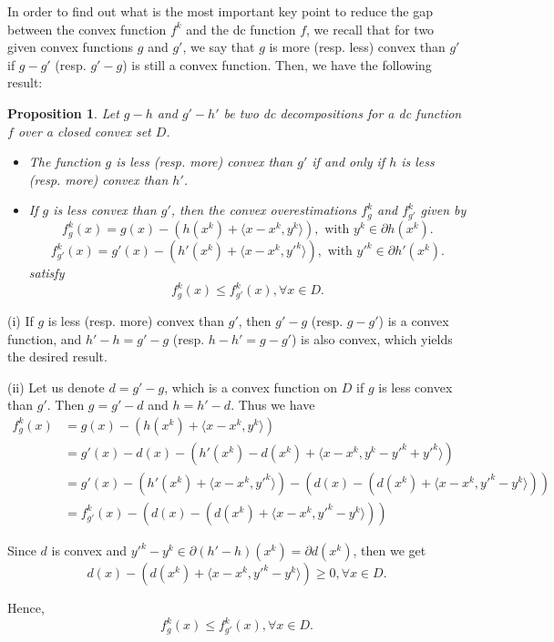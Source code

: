 \documentclass[3p]{elsarticle}
\newtheorem{prop}[thm]{Proposition}
\begin{document}
In order to find out what is the most important key point to reduce the gap between the convex function $f^k$ and the dc function $f$, we recall that for two given convex functions $g$ and $g'$, we say that $g$ is more (resp. less) convex than $g'$ if $g-g'$ (resp. $g'-g$) is still a convex function. Then, we have the following result:
\begin{prop}\label{prop:betterdcd}
	Let $g-h$ and $g'-h'$ be two dc decompositions for a dc function $f$ over a closed convex set $D$. 
	\begin{itemize}
		\item[(i)] The function $g$ is less (resp. more) convex than $g'$ if and only if $h$ is less (resp. more) convex than $h'$.
		\item[(ii)] If $g$ is less convex than $g'$, then the convex overestimations $f_g^k$ and $f_{g'}^k$ given by  \[f_g^k(x) = g(x) - (h(x^{k})+\langle x-x^{k},y^{k}\rangle), \text{ with } y^k\in\partial h(x^k). \]
		\[f_{g'}^k(x) = g'(x) - (h'(x^{k})+\langle x-x^{k},y'^{k}\rangle), \text{ with } y'^k\in\partial h'(x^k).\]
		satisfy \[f_g^k(x)\leq f_{g'}^k(x),\forall x\in D.\]
	\end{itemize}
\end{prop}
\begin{pf}
	(i) If $g$ is less (resp. more) convex than $g'$, then $g'-g$ (resp. $g-g'$) is a convex function, and $h'-h = g'- g$ (resp. $h-h' = g-g'$) is also convex, which yields the desired result.
	
	\noindent(ii) Let us denote $d = g'-g$, which is a convex function on $D$ if $g$ is less convex than $g'$. Then $g = g'-d$ and $h=h'-d$. Thus we have
	\begin{equation}\nonumber
	\begin{array}{rl}
	f_g^k(x) &= g(x) - (h(x^{k})+\langle x-x^{k},y^{k}\rangle) \\
	&= g'(x)-d(x) - (h'(x^{k}) - d(x^k) + \langle x-x^{k},y^{k}-y'^k+y'^k\rangle)\\
	&= g'(x) - (h'(x^k) + \langle x-x^k,y'^k\rangle) - (d(x) - (d(x^k) + \langle x-x^k,y'^k-y^k\rangle))\\
	&= f_{g'}^k(x) - (d(x) - (d(x^k) + \langle x-x^k,y'^k-y^k\rangle))
	\end{array}
	\end{equation}
	
	Since $d$ is convex and $y'^k-y^k \in \partial (h'-h) (x^k) = \partial d(x^k)$, then we get \[d(x) - (d(x^k) + \langle x-x^k,y'^k-y^k\rangle) \geq 0, \forall x\in D.\]
	
	Hence, \[f_g^k(x)\leq f_{g'}^k(x),\forall x\in D.\]
\end{pf}
\end{document}
